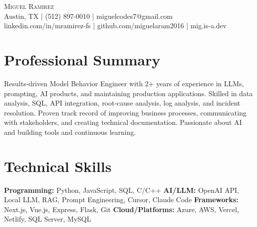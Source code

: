 \documentclass[letterpaper,10pt]{article}
\begin{document}
\begin{center}
  {\Large \scshape Miguel Ramirez} \\ \vspace{0pt}
  Austin, TX | (512) 897-0010 | miguelcodes7@gmail.com \\ 
  linkedin.com/in/mramirez-fs | github.com/miguelaram2016 | mig.is-a.dev
\end{center}

\section*{Professional Summary}
Results-driven Model Behavior Engineer with 2+ years of experience in LLMs, prompting, AI products, and maintaining production applications. Skilled in data analysis, SQL, API integration, root-cause analysis, log analysis, and incident resolution. Proven track record of improving business processes, communicating with stakeholders, and creating technical documentation. Passionate about AI and building tools and continuous learning.

\section*{Technical Skills}
\textbf{Programming:} Python, JavaScript, SQL, C/C++ \newline
\textbf{AI/LLM:} OpenAI API, Local LLM, RAG, Prompt Engineering, Cursor, Claude Code \newline
\textbf{Frameworks:} Next.js, Vue.js, Express, Flask, Git \newline
\textbf{Cloud/Platforms:} Azure, AWS, Vercel, Netlify, SQL Server, MySQL

\end{document}
